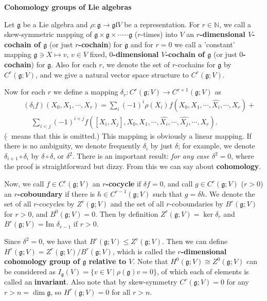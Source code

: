 \documentclass{article}
\newcommand{\NaN}{\mathbb{N}}
\newcommand{\SBar}{\;|\;}
\newcommand{\lie}[1]{\mathfrak{#1}}
\begin{document}
\newpage

\textbf{Cohomology groups of Lie algebras}

 Let $\lie{g}$ be a Lie algebra and $\rho : \lie{g} \to \lie{gl}{V}$ be a representation.
For $r \in \NaN$, we call a skew-symmetric mapping of $\lie{g} \times \lie{g} \times \cdots \cdots \lie{g}$ ($r$-times) into $V$ an \textbf{$r$-dimensional $V$-cochain of $\lie{g}$} (or just \textbf{$r$-cochain}) for $\lie{g}$ and for $r = 0$ we call a 'constant' mapping $\lie{g} \ni X \mapsto v$, $v \in V$ fixed, \textbf{$0$-dimensional $V$-cochain of $\lie{g}$} (or just \textbf{$0$-cochain}) for $\lie{g}$.
Also for each $r$, we denote the set of $r$-cochains for $\lie{g}$ by $C^r(\lie{g}; V)$, and we give a natural vector space structure to $C^r(\lie{g}; V)$.

Now for each $r$ we define a mapping $\delta_r : C^r(\lie{g}; V) \to C^{r + 1}(\lie{g}; V)$ as
\begin{eqnarray*}
  & & (\delta_i f)(X_0, X_1, \cdots, X_r) = \sum_i (-1)^i \rho(X_i) f(X_0, X_1, \cdots, \hat{X_i}, \cdots, X_r) + \\
  & & \;\;\;\; \sum_{i < j} (-1)^{i + j} f([X_i, X_j], X_0, X_1, \cdots, \hat{X_i}, \cdots, \hat{X_j}, \cdots, X_r).
\end{eqnarray*}
($\hat{\;}$ means that this is omitted.)
This mappimg is obviously a linear mapping.
If there is no ambiguity, we denote frequently $\delta_i$ by just $\delta$; for example, we denote $\delta_{i + 1} \circ \delta_i$ by $\delta \circ \delta$, or $\delta^2$.
There is an important result: \textit{for any case $\delta^2 = 0$}, where the proof is straightforward but dizzy.
From this we can say about \textbf{cohomology}.

Now, we call $f \in C^r(\lie{g}; V)$ an \textbf{$r$-cocycle} if $\delta f = 0$, and call $g \in C^r(\lie{g}; V)$ ($r > 0$) an \textbf{$r$-coboundary} if there is $h \in C^{r - 1}(\lie{g}; V)$ such that $g = \delta h$.
We denote the set of all $r$-cocycles by $Z^r(\lie{g}; V)$ and the set of all $r$-coboundaries by $B^r(\lie{g}; V)$ for $r > 0$, and $B^0(\lie{g}; V) = 0$.
Then by definition $Z^r(\lie{g}; V) = \ker{\delta_r}$ and $B^r(\lie{g}; V) = \textrm{Im } \delta_{r - 1}$ if $r > 0$.

Since $\delta^2 = 0$, we have that $B^r(\lie{g}; V) \le Z^r(\lie{g}; V)$.
Then we can define $H^r(\lie{g}; V) = Z^r(\lie{g}; V) / B^r(\lie{g}; V)$, which is called the \textbf{$r$-dimensional cohomology group of $\lie{g}$ relative to $V$}.
Note that $H^0(\lie{g}; V) \cong Z^0(\lie{g}; V)$ can be considered as $I_\lie{g}(V) = \{v \in V \SBar \rho(\lie{g}) v = 0\}$, of which each of elements is called an \textbf{invariant}.
Also note that by skew-symmetry $C^r(\lie{g}; V) = 0$ for any $r > n = \dim{\lie{g}}$, so $H^r(\lie{g}; V) = 0$ for all $r > n$.
\end{document}
